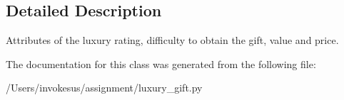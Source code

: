 \subsection{Detailed Description}
\begin{DoxyVerb}Attributes of the luxury rating, difficulty to obtain the gift, value and price.
\end{DoxyVerb}
 

The documentation for this class was generated from the following file\+:\begin{DoxyCompactItemize}
\item 
/\+Users/invokesus/assignment/luxury\+\_\+gift.\+py\end{DoxyCompactItemize}
